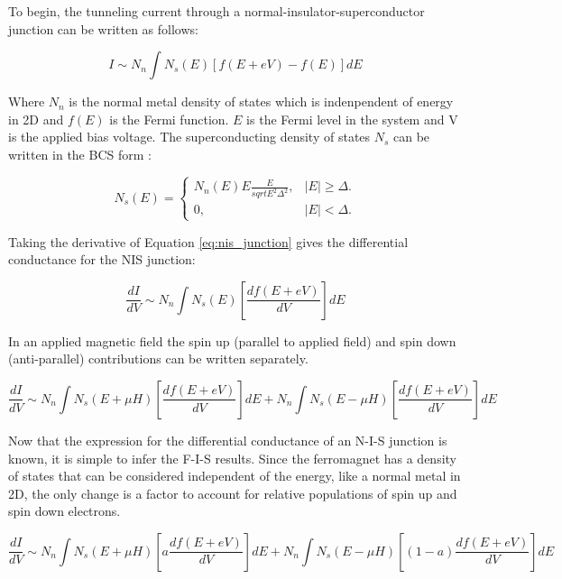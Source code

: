 To begin, the tunneling current through a normal-insulator-superconductor junction can be written as follows:

\begin{equation}
    \label{eq:nis_junction}
    I \sim N_n \int N_s(E)[f(E+eV) - f(E)]dE
\end{equation}

Where $N_n$ is the normal metal density of states which is indenpendent of energy in 2D and $f(E)$ is the Fermi function. $E$ is the Fermi level in the system and V is the applied bias voltage. The superconducting density of states $N_s$ can be written in the BCS form \cite{Tinkham1996}:

\begin{equation}
    \label{eq:bcs_dos}
    N_s(E) = \begin{cases}
    N_n(E)E\frac{E}{sqrt{E^2 \Delta^2}}, & |E| \geq \Delta.\\
    0, & |E| < \Delta.
  \end{cases}
\end{equation}

Taking the derivative of Equation \ref{eq:nis_junction} gives the differential conductance for the NIS junction:

\begin{equation}
    \label{eq:nis_diffcond}
    \frac{dI}{dV} \sim N_n \int N_s(E)[\frac{df(E+eV)}{dV}]dE
\end{equation}

In an applied magnetic field the spin up (parallel to applied field) and spin down (anti-parallel) contributions can be written separately.

\begin{equation}
    \label{eq:nis_diffcond_field}
    \frac{dI}{dV} \sim N_n \int N_s(E+\mu H)[\frac{df(E+eV)}{dV}]dE + N_n \int N_s(E-\mu H)[\frac{df(E+eV)}{dV}]dE
\end{equation}

Now that the expression for the differential conductance of an N-I-S junction is known, it is simple to infer the F-I-S results. Since the ferromagnet has a density of states that can be considered independent of the energy, like a normal metal in 2D, the only change is a factor to account for relative populations of spin up and spin down electrons.

\begin{equation}
    \label{eq:fis_diffcond_field}
    \frac{dI}{dV} \sim N_n \int N_s(E+\mu H)[a\frac{df(E+eV)}{dV}]dE + N_n \int N_s(E-\mu H)[(1-a)\frac{df(E+eV)}{dV}]dE
\end{equation}

